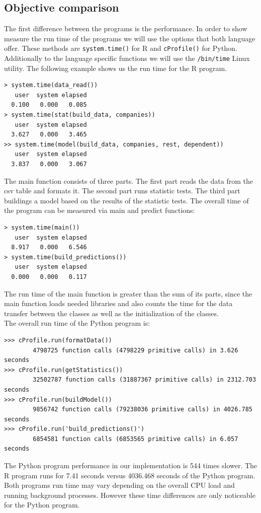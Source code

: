 \documentclass [twoside,
  11pt, a4paper,
  footinclude=true,
  headinclude=true,
  cleardoublepage=empty
]{article}
\begin{document}
\subsection{Objective comparison}
The first difference between the programs is the performance. In order to show measure the run time of the programs we will use the options that both language offer. These methods are \texttt{system.time()} for R and \texttt{cProfile()} for Python. Additionally to the language specific functions we will use the \texttt{/bin/time} Linux utility. The following example shows us the run time for the R program.
\begin{verbatim}
> system.time(data_read())                                                  
   user  system elapsed                                                         
  0.100   0.000   0.085  
> system.time(stat(build_data, companies))
   user  system elapsed 
  3.627   0.000   3.465
>> system.time(model(build_data, companies, rest, dependent))
   user  system elapsed 
  3.837   0.000   3.067 
\end{verbatim}
The main function consists of three parts. The first part reads the data from the csv table and formats it. The second part runs statistic tests. The third part buildings a model based on the results of the statistic tests. The overall time of the program can be measured via main and predict functions:
\begin{verbatim}
> system.time(main())
   user  system elapsed 
  8.917   0.000   6.546 
> system.time(build_predictions())
   user  system elapsed 
  0.000   0.000   0.117 
\end{verbatim}
The run time of the main function is greater than the sum of its parts, since the main function loads needed libraries and also counts the time for the data transfer between the classes as well as the initialization of the classes.\\
The overall run time of the Python program is:
\begin{verbatim}
>>> cProfile.run(formatData())
        4798725 function calls (4798229 primitive calls) in 3.626 seconds
>>> cProfile.run(getStatistics())
        32502787 function calls (31887367 primitive calls) in 2312.703 seconds
>>> cProfile.run(buildModel())
        9856742 function calls (79238036 primitive calls) in 4026.785 seconds
>>> cProfile.run('build_predictions()')
        6854581 function calls (6853565 primitive calls) in 6.057 seconds
\end{verbatim}
The Python program performance in our implementation is 544 times slower. The R program runs for 7.41 seconds versus 4036.468 seconds of the Python program. Both programs run time may vary depending on the overall CPU load and running background processes. However these time differences are only noticeable for the Python program.\\
\end{document}
